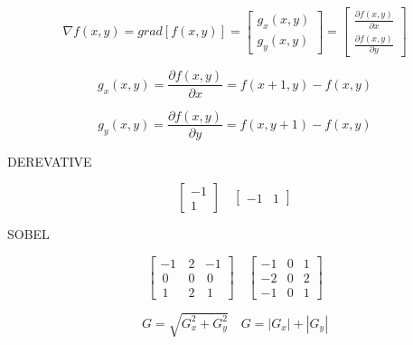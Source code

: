 \documentclass[12pt]{article}
\begin{document}
$$
\nabla f(x,y) 
= 
grad[f(x,y)]
=
\begin{bmatrix}
g_x(x,y)\\
g_y(x,y)
\end{bmatrix}
=
\begin{bmatrix}
\frac{\partial f(x,y)}
{\partial x}\\
\frac{\partial f(x,y)}
{\partial y}
\end{bmatrix}
$$

$$
g_x(x,y) 
= 
\frac{\partial f(x,y)}
{\partial x}
=
f(x+1,y) - f(x,y)
$$

$$
g_y(x,y) 
= 
\frac{\partial f(x,y)}
{\partial y}
=
f(x,y+1) - f(x,y)
$$

DEREVATIVE

$$
\begin{bmatrix}
-1\\1
\end{bmatrix}
\quad
\begin{bmatrix}
-1 & 1
\end{bmatrix}
$$

SOBEL

$$
\begin{bmatrix}
 -1 & \,2 & -1 \\
\,0 & \,0 &\,0 \\
\,1 & \,2 &\,1
\end{bmatrix}
\quad
\begin{bmatrix}
-1 & 0 &  1 \\
-2 & 0 &  2 \\
-1 & 0 &  1
\end{bmatrix}
$$

$$
G 
=
\sqrt{G_x^2 + G_y^2}
\quad
G
=
|G_x| + |G_y|
$$
\end{document}
